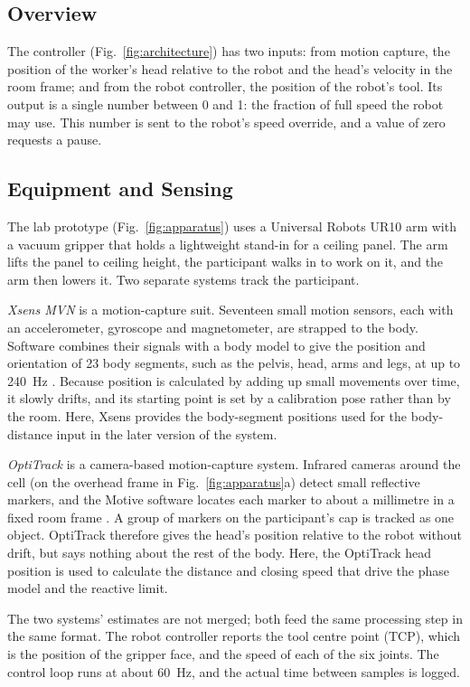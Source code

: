 \documentclass{IEEEtran}
\begin{document}
\subsection{Overview}
The controller (Fig.~\ref{fig:architecture}) has two inputs: from motion
capture, the position of the worker's head relative to the robot and the
head's velocity in the room frame; and from the robot controller, the position
of the robot's tool. Its output is a single number
between 0 and 1: the fraction of full speed the robot may use. This number is
sent to the robot's speed override, and a value of zero requests a pause.

\subsection{Equipment and Sensing}
\label{sec:apparatus}
The lab prototype (Fig.~\ref{fig:apparatus}) uses a Universal Robots UR10 arm
with a vacuum gripper that holds a lightweight stand-in for a ceiling panel. The
arm lifts the panel to ceiling height, the participant walks in to work on it,
and the arm then lowers it. Two separate systems track the participant.

\emph{Xsens MVN} is a motion-capture suit. Seventeen small motion sensors, each
with an accelerometer, gyroscope and magnetometer, are strapped to the body.
Software combines their signals with a body model to give the position and
orientation of 23 body segments, such as the pelvis, head, arms and legs, at up
to 240~Hz \cite{roetenberg2009xsens,schepers2018xsens}. Because position is
calculated by adding up small movements over time, it slowly drifts, and its
starting point is set by a calibration pose rather than by the room. Here,
Xsens provides the body-segment positions used for the body-distance input in
the later version of the system.

\emph{OptiTrack} is a camera-based motion-capture system. Infrared cameras
around the cell (on the overhead frame in Fig.~\ref{fig:apparatus}a) detect
small reflective markers, and the Motive software locates each marker to about
a millimetre in a fixed room frame \cite{optitrack2024motive}. A group of
markers on the participant's cap is tracked as one object. OptiTrack therefore
gives the head's position relative to the robot without drift, but says
nothing about the rest of the body. Here, the OptiTrack head position is used
to calculate the distance and closing speed that drive the phase model and the
reactive limit.

The two systems' estimates are not merged; both feed the same processing step
in the same format. The robot
controller reports the tool centre point (TCP), which is the position of the
gripper face, and the speed of each of the six joints. The control loop runs
at about 60~Hz, and the actual time between samples is logged.
\end{document}
